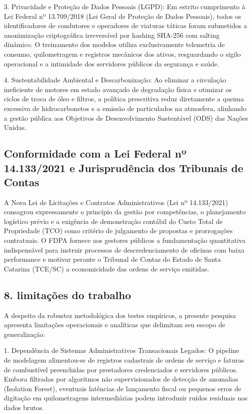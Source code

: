 \documentclass[12pt,a4paper]{article}
\begin{document}
3. Privacidade e Proteção de Dados Pessoais (LGPD): Em estrito cumprimento à Lei Federal nº 13.709/2018 (Lei Geral de Proteção de Dados Pessoais), todos os identificadores de condutores e operadores de viaturas táticas foram submetidos a anonimização criptográfica irreversível por hashing SHA-256 com salting dinâmico. O treinamento dos modelos utiliza exclusivamente telemetria de consumo, quilometragem e registros mecânicos dos ativos, resguardando o sigilo operacional e a intimidade dos servidores públicos da segurança e saúde.

4. Sustentabilidade Ambiental e Descarbonização: Ao eliminar a circulação ineficiente de motores em estado avançado de degradação física e otimizar os ciclos de troca de óleo e filtros, a política prescritiva reduz diretamente a queima excessiva de hidrocarbonetos e a emissão de particulados na atmosfera, alinhando a gestão pública aos Objetivos de Desenvolvimento Sustentável (ODS) das Nações Unidas.


\subsection{Conformidade com a Lei Federal nº 14.133/2021 e Jurisprudência dos Tribunais de Contas}

A Nova Lei de Licitações e Contratos Administrativos (Lei nº 14.133/2021) consagrou expressamente o princípio da gestão por competências, o planejamento logístico prévio e a exigência de demonstração contábil do Custo Total de Propriedade (TCO) como critério de julgamento de propostas e prorrogações contratuais. O FDPA fornece aos gestores públicos a fundamentação quantitativa indispensável para instruir processos de descredenciamento de oficinas com baixa performance e motivar perante o Tribunal de Contas do Estado de Santa Catarina (TCE/SC) a economicidade das ordens de serviço emitidas.


\subsection{8. limitações do trabalho}

A despeito da robustez metodológica dos testes empíricos, a presente pesquisa apresenta limitações operacionais e analíticas que delimitam seu escopo de generalização:

1. Dependência de Sistemas Administrativos Transacionais Legados: O pipeline de modelagem alimentou-se de registros cadastrais de ordens de serviço e faturas de combustível preenchidas por prestadores credenciados e servidores públicos. Embora filtradas por algoritmos não supervisionados de detecção de anomalias (Isolation Forest), eventuais latências de lançamento fiscal ou pequenos erros de digitação em quilometragens intermediárias podem introduzir ruídos residuais nos dados brutos.
\end{document}
